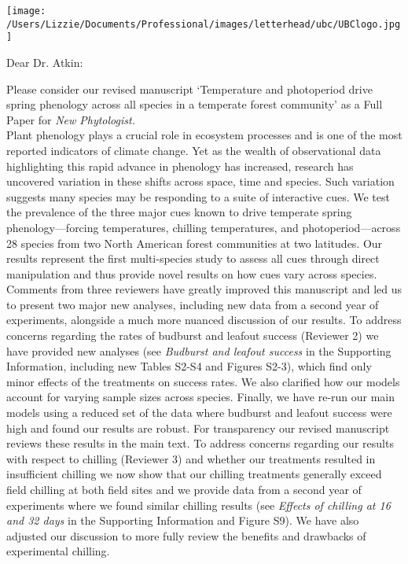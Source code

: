 \documentclass[11pt,a4paper]{letter}
\begin{document}
\begin{letter}{}
\texttt{[image: /Users/Lizzie/Documents/Professional/images/letterhead/ubc/UBClogo.jpg]}

\opening{Dear Dr. Atkin:}

\noindent Please consider our revised manuscript `Temperature and photoperiod drive spring phenology across all species in a temperate forest community' as a Full Paper for \emph{New Phytologist.} 
\vspace{1.5ex}\\
Plant phenology plays a crucial role in ecosystem processes and is one of the most reported indicators of climate change. Yet as the wealth of observational data highlighting this rapid advance in phenology has increased, research has uncovered variation in these shifts across space, time and species. Such variation suggests many species may be responding to a suite of interactive cues. We test the prevalence of the three major cues known to drive temperate spring phenology---forcing temperatures, chilling temperatures, and photoperiod---across 28 species from two North American forest communities at two latitudes. Our results represent the first multi-species study to assess all cues through direct manipulation and thus provide novel results on how cues vary across species. %
\vspace{1.5ex}\\
Comments from three reviewers have greatly improved this manuscript and led us to present two major new analyses, including new data from a second year of experiments, alongside a much more nuanced discussion of our results. To address concerns regarding the rates of budburst and leafout success (Reviewer 2) we have provided new analyses (see \emph{Budburst and leafout success} in the Supporting Information, including new Tables S2-S4 and Figures S2-3), which find only minor effects of the treatments on success rates. We also clarified how our models account for varying sample sizes across species. Finally, we have re-run our main models using a reduced set of the data where budburst and leafout success were high and found our results are robust. For transparency our revised manuscript reviews these results in the main text. To address concerns regarding our results with respect to chilling (Reviewer 3) and whether our treatments resulted in insufficient chilling we now show that our chilling treatments generally exceed field chilling at both field sites and we provide data from a second year of experiments where we found similar chilling results (see \emph{Effects of chilling at 16 and 32 days} in the Supporting Information and Figure S9). We have also adjusted our discussion to more fully review the benefits and drawbacks of experimental chilling.

\end{letter}
\end{document}

